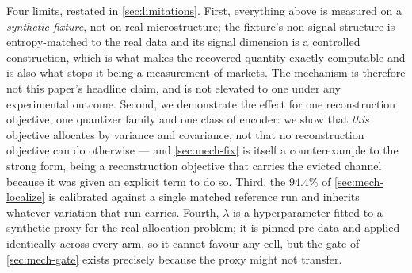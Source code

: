 Four limits, restated in \cref{sec:limitations}. First, everything above is measured on a
\emph{synthetic fixture}, not on real microstructure; the fixture's non-signal structure is
entropy-matched to the real data and its signal dimension is a controlled construction, which is
what makes the recovered quantity exactly computable and is also what stops it being a measurement
of markets. The mechanism is therefore not this paper's headline claim, and is not elevated to one
under any experimental outcome. Second, we demonstrate the effect for one reconstruction objective,
one quantizer family and one class of encoder: we show that \emph{this} objective allocates by
variance and covariance, not that no reconstruction objective can do otherwise --- and
\cref{sec:mech-fix} is itself a counterexample to the strong form, being a reconstruction objective
that carries the evicted channel because it was given an explicit term to do so. Third, the
$94.4\%$ of \cref{sec:mech-localize} is calibrated against a single matched reference run and
inherits whatever variation that run carries. Fourth, $\lambda$ is a hyperparameter fitted to a
synthetic proxy for the real allocation problem; it is pinned pre-data and applied identically
across every arm, so it cannot favour any cell, but the gate of \cref{sec:mech-gate} exists
precisely because the proxy might not transfer.
